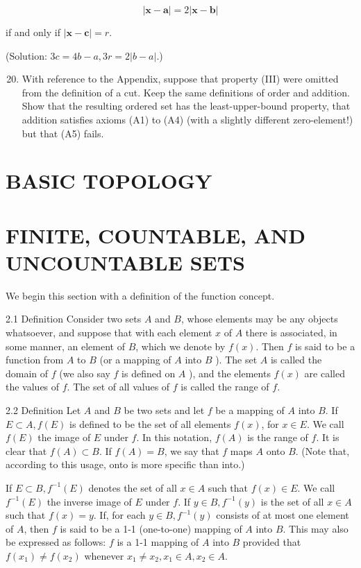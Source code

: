 \documentclass[10pt]{article}
\begin{document}
$$
|\mathbf{x}-\mathbf{a}|=2|\mathbf{x}-\mathbf{b}|
$$

if and only if $|\mathbf{x}-\mathbf{c}|=r$.

(Solution: $3 c=4 b-a, 3 r=2|b-a|$.)

\begin{enumerate}
  \setcounter{enumi}{19}
  \item With reference to the Appendix, suppose that property (III) were omitted from the definition of a cut. Keep the same definitions of order and addition. Show that the resulting ordered set has the least-upper-bound property, that addition satisfies axioms (A1) to (A4) (with a slightly different zero-element!) but that (A5) fails.
\end{enumerate}

\section{BASIC TOPOLOGY}
\section{FINITE, COUNTABLE, AND UNCOUNTABLE SETS}
We begin this section with a definition of the function concept.

2.1 Definition Consider two sets $A$ and $B$, whose elements may be any objects whatsoever, and suppose that with each element $x$ of $A$ there is associated, in some manner, an element of $B$, which we denote by $f(x)$. Then $f$ is said to be a function from $A$ to $B$ (or a mapping of $A$ into $B$ ). The set $A$ is called the domain of $f$ (we also say $f$ is defined on $A$ ), and the elements $f(x)$ are called the values of $f$. The set of all values of $f$ is called the range of $f$.

2.2 Definition Let $A$ and $B$ be two sets and let $f$ be a mapping of $A$ into $B$. If $E \subset A, f(E)$ is defined to be the set of all elements $f(x)$, for $x \in E$. We call $f(E)$ the image of $E$ under $f$. In this notation, $f(A)$ is the range of $f$. It is clear that $f(A) \subset B$. If $f(A)=B$, we say that $f$ maps $A$ onto $B$. (Note that, according to this usage, onto is more specific than into.)

If $E \subset B, f^{-1}(E)$ denotes the set of all $x \in A$ such that $f(x) \in E$. We call $f^{-1}(E)$ the inverse image of $E$ under $f$. If $y \in B, f^{-1}(y)$ is the set of all $x \in A$ such that $f(x)=y$. If, for each $y \in B, f^{-1}(y)$ consists of at most one element of $A$, then $f$ is said to be a 1-1 (one-to-one) mapping of $A$ into $B$. This may also be expressed as follows: $f$ is a 1-1 mapping of $A$ into $B$ provided that $f\left(x_{1}\right) \neq f\left(x_{2}\right)$ whenever $x_{1} \neq x_{2}, x_{1} \in A, x_{2} \in A$.
\end{document}
